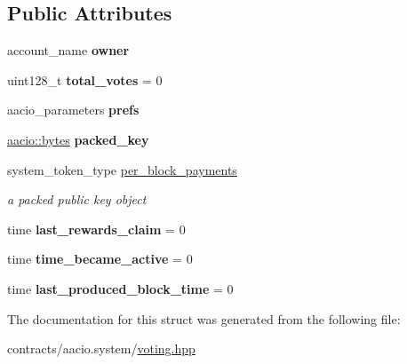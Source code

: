 \subsection*{Public Attributes}
\begin{DoxyCompactItemize}
\item 
\mbox{\label{structaaciosystem_1_1voting_1_1producer__info_a01760720a0a41682877f25f53aac3a9e}} 
account\+\_\+name {\bfseries owner}
\item 
\mbox{\label{structaaciosystem_1_1voting_1_1producer__info_a0ce054d7f8906f994bd4969321791773}} 
uint128\+\_\+t {\bfseries total\+\_\+votes} = 0
\item 
\mbox{\label{structaaciosystem_1_1voting_1_1producer__info_a14799dafd89fb46643aa43ef65dbdbe0}} 
aacio\+\_\+parameters {\bfseries prefs}
\item 
\mbox{\label{structaaciosystem_1_1voting_1_1producer__info_a54a98899885e3288347eac8c6edefcf9}} 
\mbox{\hyperlink{classstd_1_1vector}{aacio\+::bytes}} {\bfseries packed\+\_\+key}
\item 
\mbox{\label{structaaciosystem_1_1voting_1_1producer__info_acefea2de8ff2156b55001bacd9e2d663}} 
system\+\_\+token\+\_\+type \mbox{\hyperlink{structaaciosystem_1_1voting_1_1producer__info_acefea2de8ff2156b55001bacd9e2d663}{per\+\_\+block\+\_\+payments}}
\begin{DoxyCompactList}\small\item\em a packed public key object \end{DoxyCompactList}\item 
\mbox{\label{structaaciosystem_1_1voting_1_1producer__info_a5f74c1d93b2dc08e546ee239d00d66e1}} 
time {\bfseries last\+\_\+rewards\+\_\+claim} = 0
\item 
\mbox{\label{structaaciosystem_1_1voting_1_1producer__info_a897b0fe84e727552d88423f50d355d0f}} 
time {\bfseries time\+\_\+became\+\_\+active} = 0
\item 
\mbox{\label{structaaciosystem_1_1voting_1_1producer__info_af035cb5892f56ead203747181a524310}} 
time {\bfseries last\+\_\+produced\+\_\+block\+\_\+time} = 0
\end{DoxyCompactItemize}


The documentation for this struct was generated from the following file\+:\begin{DoxyCompactItemize}
\item 
contracts/aacio.\+system/\mbox{\hyperlink{voting_8hpp}{voting.\+hpp}}\end{DoxyCompactItemize}
